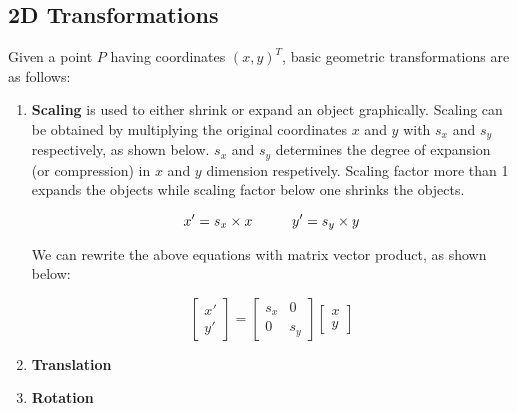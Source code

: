\documentclass{book}
\begin{document}
            \subsection{2D Transformations} 
                Given a point $P$ having coordinates $(x,y)^{T}$, basic geometric transformations are as follows:
                \begin{enumerate}
                    \item \textbf{Scaling} is used to either shrink or expand an object graphically. Scaling can be obtained by multiplying
                    the original coordinates $x$ and $y$ with $s_{x}$ and $s_{y}$ respectively, as shown below. $s_{x}$ and $s_{y}$ determines 
                    the degree of expansion (or compression) in $x$ and $y$ dimension respetively. Scaling factor more than 1 expands the objects 
                    while scaling factor below one shrinks the objects.
                    
                    \begin{equation}
                        x' = s_{x} \times x \hspace{10mm} y' = s_{y} \times y
                    \end{equation} 

                    We can rewrite the above equations with matrix vector product, as shown below: 

                    \begin{equation}
                        \begin{bmatrix}
                            x'\\ 
                            y'
                            \end{bmatrix} = \begin{bmatrix}
                            s_{x} & 0\\ 
                            0 & s_{y}
                            \end{bmatrix}
                            \begin{bmatrix}
                            x\\ 
                            y
                            \end{bmatrix}
                    \end{equation}

                    \item \textbf{Translation}
                    \item \textbf{Rotation}
                \end{enumerate}
\end{document}
